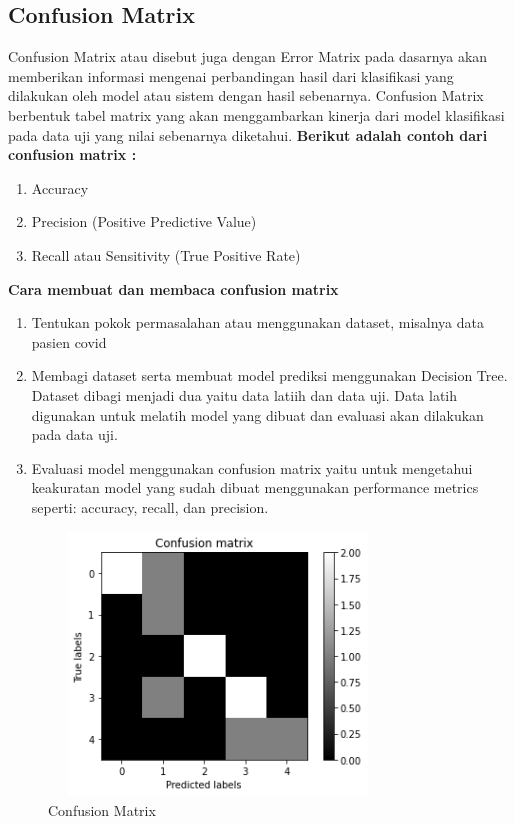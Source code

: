 \subsection{Confusion Matrix}
Confusion Matrix atau disebut juga dengan Error Matrix pada dasarnya akan memberikan informasi mengenai perbandingan hasil dari klasifikasi yang dilakukan oleh model atau sistem dengan hasil sebenarnya. Confusion Matrix berbentuk tabel matrix yang akan menggambarkan kinerja dari model klasifikasi pada data uji yang nilai sebenarnya diketahui.
	\newline 
	\textbf {Berikut adalah contoh dari confusion matrix :}
	\begin{enumerate}
		\item Accuracy
		\item Precision (Positive Predictive Value)
		\item Recall atau Sensitivity (True Positive Rate)
	\end{enumerate}
    \textbf {Cara membuat dan membaca confusion matrix}
	\begin{enumerate}
		\item Tentukan pokok permasalahan atau menggunakan dataset, misalnya data pasien covid
		\item Membagi dataset serta membuat model prediksi menggunakan Decision Tree. Dataset dibagi menjadi dua yaitu data latiih dan data uji. Data latih digunakan untuk melatih model yang dibuat dan evaluasi akan dilakukan pada data uji. 
		\item Evaluasi model menggunakan confusion matrix yaitu untuk mengetahui keakuratan model yang sudah dibuat menggunakan performance metrics seperti: accuracy, recall, dan precision.
	\end{enumerate}
    \begin{figure}[!htbp]
		\centering
		\includegraphics[width=9cm,height=7cm]{figures/confusion_matrix.png}
		\caption{Confusion Matrix}
		\label{penanda}
	\end{figure}

